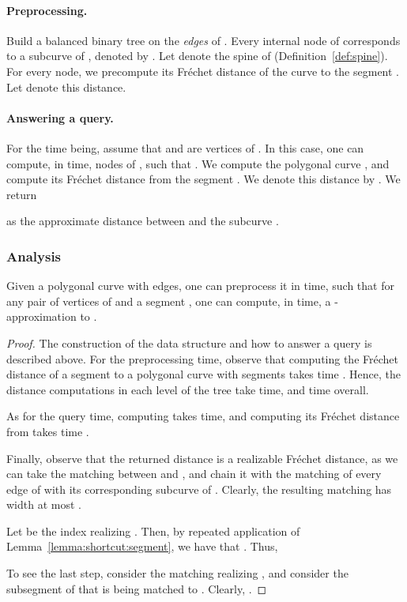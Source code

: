 \documentclass[12pt]{article}
\newcommand{\lemlab}[1]{\label{lemma:#1}}
\newcommand{\lemref}[1]{Lemma~\ref{lemma:#1}}
\newcommand{\defref}[1]{Definition~\ref{def:#1}}
\newcommand{\Frechet}{Fr\'{e}c{h}e{}t\xspace}\providecommand{\Arr}{\mathop{\mathrm{\EuScript{A}}}}
\numberwithin{figure}{section}
\numberwithin{equation}{section}
\newcommand{\matching}{matching\xspace}
\begin{document}
\paragraph{Preprocessing.}
Build a balanced binary tree  on the \emph{edges} of .
Every internal node  of  corresponds to a subcurve of
, denoted by . Let  denote the
spine of  (\defref{spine}).  For every node, we
precompute its \Frechet distance of the curve  to the
segment . Let  denote this distance.

\paragraph{Answering a query.}
For the time being, assume that  and  are vertices of .  In
this case, one can compute, in  time,  nodes
 of , such that . We compute the polygonal curve , and
compute its \Frechet distance from the segment . We denote
this distance by . We return

as the approximate distance between {} and the subcurve
.

\subsubsection{Analysis}

\begin{lemma}
    \lemlab{easy:shortcut}Given a polygonal curve  with  edges, one can preprocess
    it in  time, such that for any pair  of
    vertices of  and a segment , one can compute, in
     time, a -approximation to
    .
\end{lemma}

\begin{proof}
    The construction of the data structure and how to answer a query
    is described above. For the preprocessing time, observe that
    computing the \Frechet distance of a segment to a polygonal curve
    with  segments takes  time
    \cite{ag-cfdbt-95}. Hence, the distance computations in each level
    of the tree  take  time, and 
    time overall.
    
    As for the query time, computing  takes  time,
    and computing its \Frechet distance from  takes  time \cite{ag-cfdbt-95}.
    
    Finally, observe that the returned distance  is a
    realizable \Frechet distance, as we can take the \matching{}
    between  and , and chain it with the \matching{}
    of every edge of  with its corresponding subcurve of
    . Clearly, the resulting \matching{} has width at most
    .
    
    Let  be the index realizing . Then, by repeated application of
    \lemref{shortcut:segment}, we have that . Thus,
    
    To see the last step, consider the \matching{} realizing
    , and consider the subsegment  of  that is being matched to . Clearly, .
\end{proof}
\end{document}
